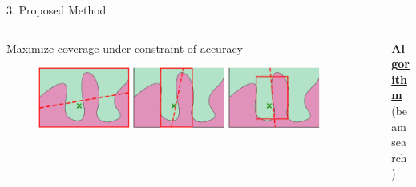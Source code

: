 \documentclass[unicode]{beamer}
\begin{document}
\begin{frame}
\begin{columns}[t]
\begin{column}{\rcol\textwidth}
\begin{block}{3. Proposed Method}
\begin{columns}[t]
\begin{column}{\lcol\textwidth}
\begin{columns}
\begin{column}{0.95\textwidth}
\begin{center}
									\vspace{0.5em}
									\underline{Maximize coverage under constraint of accuracy}
								\end{center}
								\vspace{0.8em}
								\begin{figure}[t]
									\centering
									\includegraphics[width=0.3\textwidth]{src/img/visual-rlime1}
									\includegraphics[width=0.3\textwidth]{src/img/visual-rlime2}
									\includegraphics[width=0.3\textwidth]{src/img/visual-rlime3}
								\end{figure}
							\end{column}
						\end{columns}
					\end{column}
					\begin{column}{\rcol\textwidth}
						\hspace{-1.0em}
						\underline{\textbf{Algorithm}} (beam search)


\end{column}
\end{columns}
\end{block}
\end{column}
\end{columns}
\end{frame}
\end{document}
